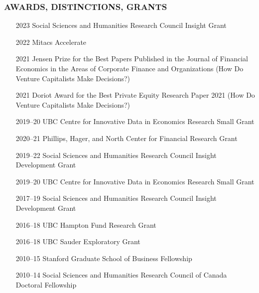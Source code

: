 \documentclass[11pt]{article}
\begin{document}
\subsubsection*{AWARDS, DISTINCTIONS, GRANTS}
\begin{itemize}
    \item[2023] Social Sciences and Humanities Research Council Insight Grant
    \item[2022] Mitacs Accelerate
    \item[2021] Jensen Prize for the Best Papers Published in the Journal of Financial Economics in the Areas of Corporate Finance and Organizations (How Do Venture Capitalists Make Decisions?)
    \item[2021] Doriot Award for the Best Private Equity Research Paper 2021 (How Do Venture Capitalists Make Decisions?)
    \item[2019--20] UBC Centre for Innovative Data in Economics Research Small Grant
    \item[2020--21] Phillips, Hager, and North Center for Financial Research Grant
    \item[2019--22] Social Sciences and Humanities Research Council Insight Development Grant
    \item[2019--20] UBC Centre for Innovative Data in Economics Research Small Grant
    \item[2017--19] Social Sciences and Humanities Research Council Insight Development Grant
    \item[2016--18] UBC Hampton Fund Research Grant
    \item[2016--18] UBC Sauder Exploratory Grant
    \item[2010--15] Stanford Graduate School of Business Fellowship
    \item[2010--14] Social Sciences and Humanities Research Council of Canada Doctoral Fellowship
\end{itemize}
\end{document}
